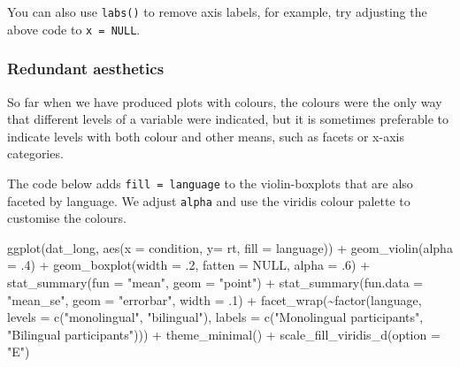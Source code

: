 \documentclass[
  english,
  doc,floatsintext]{apa6}
\newenvironment{Shaded}{\begin{snugshade}}{\end{snugshade}}
\newcommand{\AttributeTok}[1]{\textcolor[rgb]{0.77,0.63,0.00}{#1}}
\newcommand{\ConstantTok}[1]{\textcolor[rgb]{0.00,0.00,0.00}{#1}}
\newcommand{\DecValTok}[1]{\textcolor[rgb]{0.00,0.00,0.81}{#1}}
\newcommand{\FunctionTok}[1]{\textcolor[rgb]{0.00,0.00,0.00}{#1}}
\newcommand{\NormalTok}[1]{#1}
\newcommand{\SpecialCharTok}[1]{\textcolor[rgb]{0.00,0.00,0.00}{#1}}
\newcommand{\StringTok}[1]{\textcolor[rgb]{0.31,0.60,0.02}{#1}}
\begin{document}
You can also use \texttt{labs()} to remove axis labels, for example, try adjusting the above code to \texttt{x\ =\ NULL}.

\hypertarget{redundant-aesthetics}{%
\subsubsection{Redundant aesthetics}\label{redundant-aesthetics}}

So far when we have produced plots with colours, the colours were the only way that different levels of a variable were indicated, but it is sometimes preferable to indicate levels with both colour and other means, such as facets or x-axis categories.

The code below adds \texttt{fill\ =\ language} to the violin-boxplots that are also faceted by language. We adjust \texttt{alpha} and use the viridis colour palette to customise the colours.

\begin{Shaded}
\begin{Highlighting}[]
\FunctionTok{ggplot}\NormalTok{(dat\_long, }\FunctionTok{aes}\NormalTok{(}\AttributeTok{x =}\NormalTok{ condition, }\AttributeTok{y=}\NormalTok{ rt, }\AttributeTok{fill =}\NormalTok{ language)) }\SpecialCharTok{+}
  \FunctionTok{geom\_violin}\NormalTok{(}\AttributeTok{alpha =}\NormalTok{ .}\DecValTok{4}\NormalTok{) }\SpecialCharTok{+}
  \FunctionTok{geom\_boxplot}\NormalTok{(}\AttributeTok{width =}\NormalTok{ .}\DecValTok{2}\NormalTok{, }\AttributeTok{fatten =} \ConstantTok{NULL}\NormalTok{, }\AttributeTok{alpha =}\NormalTok{ .}\DecValTok{6}\NormalTok{) }\SpecialCharTok{+}
  \FunctionTok{stat\_summary}\NormalTok{(}\AttributeTok{fun =} \StringTok{"mean"}\NormalTok{, }\AttributeTok{geom =} \StringTok{"point"}\NormalTok{) }\SpecialCharTok{+}
  \FunctionTok{stat\_summary}\NormalTok{(}\AttributeTok{fun.data =} \StringTok{"mean\_se"}\NormalTok{, }\AttributeTok{geom =} \StringTok{"errorbar"}\NormalTok{, }\AttributeTok{width =}\NormalTok{ .}\DecValTok{1}\NormalTok{) }\SpecialCharTok{+}
  \FunctionTok{facet\_wrap}\NormalTok{(}\SpecialCharTok{\textasciitilde{}}\FunctionTok{factor}\NormalTok{(language, }
                     \AttributeTok{levels =} \FunctionTok{c}\NormalTok{(}\StringTok{"monolingual"}\NormalTok{, }\StringTok{"bilingual"}\NormalTok{),}
                     \AttributeTok{labels =} \FunctionTok{c}\NormalTok{(}\StringTok{"Monolingual participants"}\NormalTok{, }
                                \StringTok{"Bilingual participants"}\NormalTok{))) }\SpecialCharTok{+}
  \FunctionTok{theme\_minimal}\NormalTok{() }\SpecialCharTok{+}
  \FunctionTok{scale\_fill\_viridis\_d}\NormalTok{(}\AttributeTok{option =} \StringTok{"E"}\NormalTok{)}
\end{Highlighting}
\end{Shaded}
\end{document}
